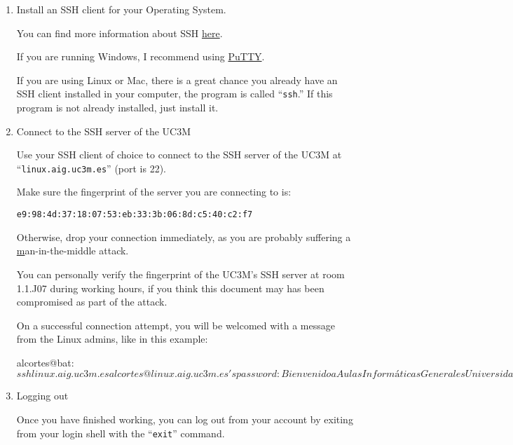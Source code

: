 \documentclass[a4paper, 12pt]{article}
\begin{document}
  \begin{enumerate}

    \item Install an SSH client for your Operating System.

      You can find more information about SSH
      \href{http://en.wikipedia.org/wiki/Secure_Shell}{here}.

      If you are running Windows, I recommend using
      \href{http://www.chiark.greenend.org.uk/~sgtatham/putty/download.html}{PuTTY}.

      If you are using Linux or Mac, there is a great chance you
      already have an SSH client installed in your computer, the program is
      called ``\texttt{ssh}.'' If this program is not already installed, just
      install it.

    \item Connect to the SSH server of the UC3M

      Use your SSH client of choice to connect to the SSH server of the UC3M at
      ``\texttt{linux.aig.uc3m.es}'' (port is 22).

      Make sure the fingerprint of the server you are connecting to is:

      \begin{center}
        \texttt{e9:98:4d:37:18:07:53:eb:33:3b:06:8d:c5:40:c2:f7}
      \end{center}

      Otherwise, drop your connection immediately, as you are probably
      suffering a
      \href{http://en.wikipedia.org/wiki/Man-in-the-middle_attackman-in-the-middle}
      man-in-the-middle attack.

      You can personally verify the fingerprint of the UC3M's SSH server at
      room 1.1.J07 during working hours, if you think this document may has
      been compromised as part of the attack.

      On a successful connection attempt, you will be welcomed with a message
      from the Linux admins, like in this example:

\begin{blackboard}
alcortes@bat:~$ ssh linux.aig.uc3m.es
alcortes@linux.aig.uc3m.es's password: 

       Bienvenido a Aulas Informáticas Generales
          Universidad Carlos III de Madrid

          Puede contactar con nosotros en:
     
                gsai@aig.uc3m.es

Last login: Tue Jan 13 13:53:33 2015 from bat.it.uc3m.es
alcortes@linux:~$
\end{blackboard}

    \item Logging out

      Once you have finished working, you can log out from
      your account by exiting from your login shell with the ``\texttt{exit}''
      command.

  \end{enumerate}
\end{document}
